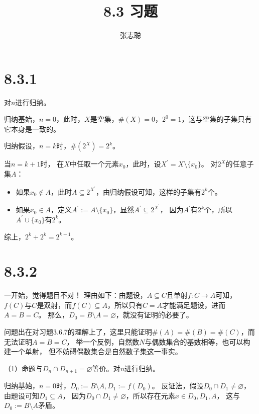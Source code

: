 \documentclass{article}
\begin{document}
\title{8.3 习题}
\author{张志聪}
\maketitle

\section*{8.3.1}

对$n$进行归纳。

归纳基始，$n=0$，此时，$X$是空集，$\#(X) = 0$，$2^0=1$，这与空集的子集只有它本身是一致的。

归纳假设，$n=k$时，$\#(2^{X}) = 2^k$。

当$n=k+1$时， 在$X$中任取一个元素$x_0$，此时，设$X^\prime = X \setminus \{x_0\}$。
对$2^{X}$的任意子集$A$：
\begin{itemize}
  \item 如果$x_0 \not \in A$，此时$A \subseteq 2^{X^\prime}$，由归纳假设可知，这样的子集有$2^k$个。
  \item 如果$x_0 \in A$，定义$A^\prime := A \setminus \{x_0\}$，显然$A^\prime \subseteq 2^{X^\prime}$，
        因为$A^\prime$有$2^k$个，所以$A^\prime \cup \{x_0\}$有$2^k$。
\end{itemize}
综上，$2^k + 2^k = 2^{k+1}$。

\section*{8.3.2}

\begin{zremark}
  一开始，觉得题目不对！
  理由如下：由题设，$A \subseteq C$且单射$f: C \rightarrow A$可知，
  $f(C)$与$C$是双射，而$f(C) \subseteq A$，所以只有$C=A$才能满足题设，进而$A=B=C$。
  那么，$D_0 = B \setminus A = \varnothing$，就没有证明的必要了。

  问题出在对习题3.6.7的理解上了，这里只能证明$\#(A) = \#(B) = \#(C)$，而无法证明$A = B = C$，
  举一个反例，自然数$N$与偶数集合的基数相等，也可以构建一个单射，
  但不妨碍偶数集合是自然数子集这一事实。
\end{zremark}

（1）命题与$D_{n} \cap D_{n+1} = \varnothing$等价。对$n$进行归纳。

归纳基始，$n = 0$时，$D_0 := B \setminus A, D_1 := f(D_0)$。
反证法，假设$D_0 \cap D_1 \neq \varnothing $，由题设可知$D_1 \subseteq A$，
因为$D_0 \cap D_1 \neq \varnothing $，所以存在元素$x \in D_0, D_1, A$，
这与$D_0 := B \setminus A$矛盾。
\end{document}
